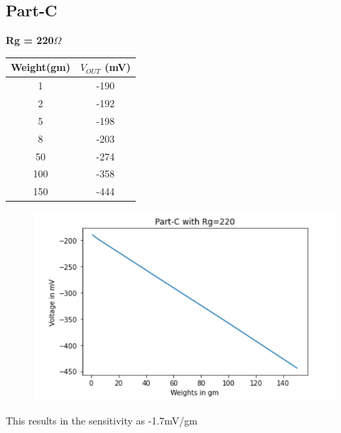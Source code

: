 \documentclass[12pt]{article}
\begin{document}
\subsection{Part-C}
\begin{center}
\textbf{Rg = 220$\Omega $}
\end{center}
\begin{center}
\begin{table}[H]
		\begin{center}
		
		\begin{tabular}{|c|c|}
			\hline
			\textbf{Weight(gm)} & \textbf{$V_{OUT}$ (mV)}\\
			\hline
			1 & -190\\
			\hline
			2 & -192\\
			\hline
                   5 & -198\\
			\hline
                   8 & -203\\
			\hline
50 & -274\\
			\hline
100 & -358\\
			\hline
150 & -444\\
			\hline
            
		\end{tabular}
		\end{center}
\end{table}
\end{center}
\begin{figure}[H]
\begin{center}
\includegraphics[scale = 1]{ci.PNG}
\end{center}
\end{figure}
This results in the sensitivity as -1.7mV/gm\\
\end{document}
